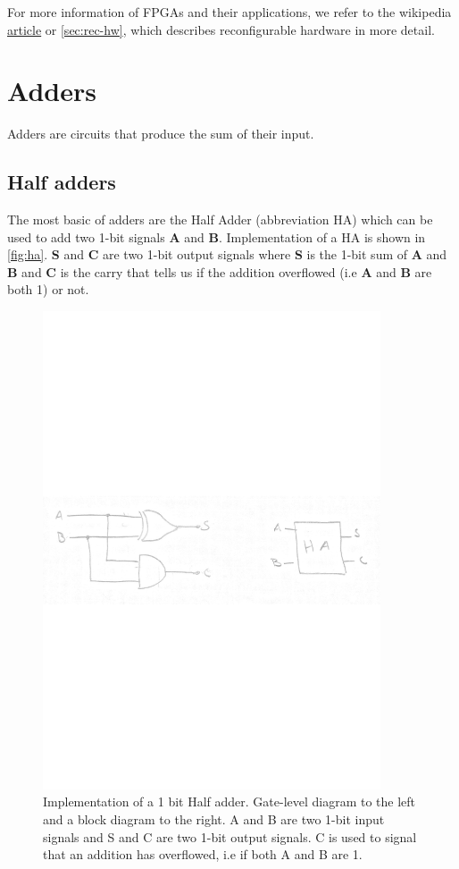\documentclass[a4paper,11pt]{report}
\begin{document}
For more information of FPGAs and their applications, we refer to the
wikipedia
\href{https://en.wikipedia.org/wiki/Field-programmable_gate_array#Applications}{article}
or \autoref{sec:rec-hw}, which describes reconfigurable hardware in more detail.

\newpage
\section{Adders}

Adders are circuits that produce the sum of their input.

\subsection{Half adders}

The most basic of adders are the Half Adder (abbreviation HA) which
can be used to add two 1-bit signals \textbf{A} and
\textbf{B}. Implementation of a HA is shown in
\autoref{fig:ha}. \textbf{S} and \textbf{C} are two 1-bit output
signals where \textbf{S} is the 1-bit sum of \textbf{A} and \textbf{B}
and \textbf{C} is the carry that tells us if the addition overflowed
(i.e \textbf{A} and \textbf{B} are both 1) or not.

\begin{figure}[H]
  \centering
  \includegraphics[width=10cm]{images/HA.pdf}
  \caption{Implementation of a 1 bit Half adder. Gate-level diagram to
    the left and a block diagram to the right. A and B are two 1-bit
    input signals and S and C are two 1-bit output signals. C is used
    to signal that an addition has overflowed, i.e if both A and B are
    1.}
  \label{fig:ha}
\end{figure}
\end{document}
